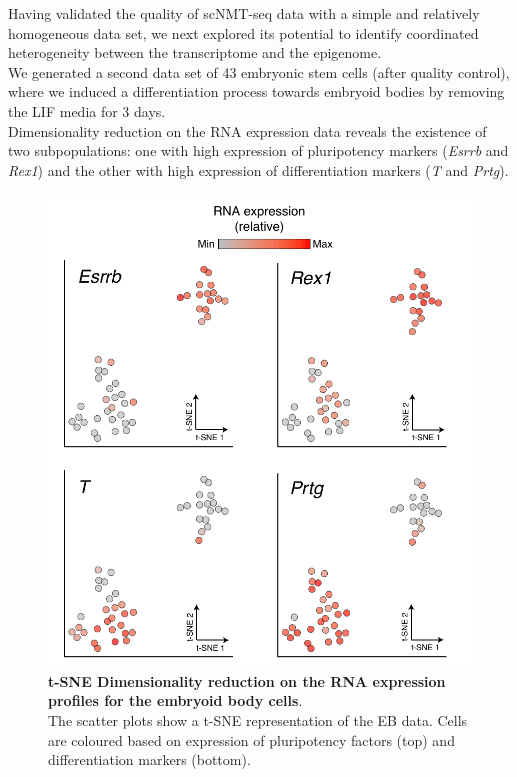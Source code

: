 Having validated the quality of scNMT-seq data with a simple and relatively homogeneous data set, we next explored its potential to identify coordinated heterogeneity between the transcriptome and the epigenome.\\
We generated a second data set of 43 embryonic stem cells (after quality control), where we induced a differentiation process towards embryoid bodies by removing the LIF media for 3 days.\\Dimensionality reduction on the RNA expression data reveals the existence of two subpopulations: one with high expression of pluripotency markers (\textit{Esrrb} and \textit{Rex1}) and the other with high expression of differentiation markers (\textit{T} and \textit{Prtg}).



\begin{figure}[H]
	\centering
	\includegraphics[width=0.7\linewidth]{scNMT_EB_RNA}
	\caption[]{\textbf{t-SNE Dimensionality reduction on the RNA expression profiles for the embryoid body cells}.\\
	The scatter plots show a t-SNE representation of the EB data. Cells are coloured based on expression of pluripotency factors (top) and differentiation markers (bottom). }
	\label{fig:scnmt_eb_rna}
\end{figure}

